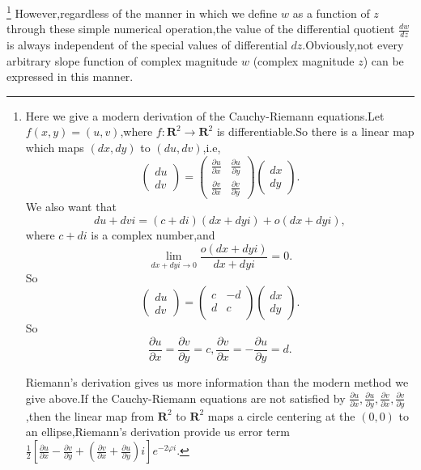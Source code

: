 \documentclass{amsart}
\newcommand\pa{{\partial}}
\theoremstyle{plain}
\theoremstyle{definition}
\begin{document}
\footnote{{\color{red}
Here we give a modern derivation of the Cauchy-Riemann equations.Let $f(x,y)=(u,v)$,where $f:\mathbf{R}^2\to \mathbf{R}^2$ is
differentiable.So there is a linear map which maps $(dx,dy)$ to $(du,dv)$,i.e,
$$
\begin{pmatrix}
  du\\
dv
\end{pmatrix}=\begin{pmatrix}
  \frac{\partial u}{\partial x}&\frac{\partial u}{\partial y}\\
\frac{\partial v}{\partial x}&\frac{\partial v}{\partial y}
\end{pmatrix}\begin{pmatrix}
  dx\\
dy
\end{pmatrix}.
$$
We also want that 
$$
du+dv i=(c+di) (dx+dy i)+o(dx+dy i),
$$
where  $c+di$ is a complex number,and 
$$
\lim_{dx+dy i\to 0} \frac{o(dx+dy i)}{dx+dy i}=0.
$$
So
$$
\begin{pmatrix}
  du\\
dv
\end{pmatrix}=\begin{pmatrix}
  c&-d\\
d&c\\
\end{pmatrix}\begin{pmatrix}
  dx\\
dy
\end{pmatrix}.
$$
So
$$
\frac{\pa u}{\pa x}=\frac{\pa v}{\pa y}=c,\frac{\pa v}{\pa x}=-\frac{\pa
u}{\pa y}=d.
$$

Riemann's derivation gives us more information than the modern method
we give above.If the Cauchy-Riemann
equations are not satisfied by $\frac{\pa u}{\pa x},\frac{\pa u}{\pa
  y},\frac{\pa v}{\pa x},\frac{\pa v}{\pa y}$,then the linear map from $\mathbf{R}^2$ to $\mathbf{R}^2$ maps a circle
centering at the $(0,0)$ to an ellipse,Riemann's derivation provide us
error term $\frac{1}{2}
  \left[
    \frac{\partial u}{\partial x}
    - \frac{\partial v}{\partial y}
    + \left(
      \frac{\partial v}{\partial x}
      + \frac{\partial u}{\partial y}
    \right) i
  \right]
  e^{-2 \varphi i}$.
  }}
However,regardless of the manner in which we define $w$ as a function
of $z$ through these simple numerical operation,the value of the
differential quotient $\frac{dw}{dz}$ is always independent of the
special values of differential $dz$.Obviously,not every arbitrary
slope function of complex magnitude $w$ (complex magnitude $z$) can be
expressed in this manner.
\end{document}
